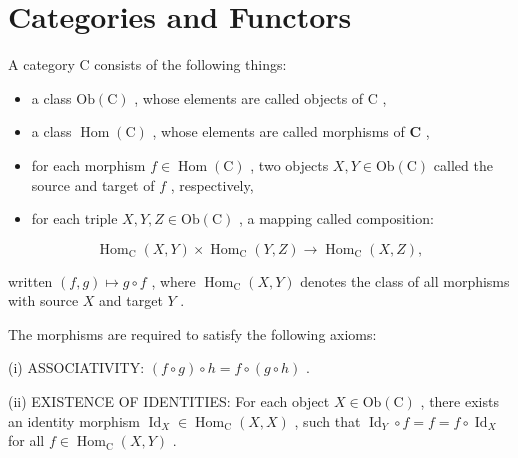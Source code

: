\section{Categories and Functors}

\begin{definition}
\label{def:3-19-extra-1}
\mathlibok
A category C consists of the following things:

\begin{itemize}
\item a class $\mathrm{{Ob}}\left( \mathrm{C}\right)$ , whose elements are called objects of $\mathrm{C}$ ,
\end{itemize}

\begin{itemize}
\item a class $\operatorname{Hom}\left( \mathrm{C}\right)$ , whose elements are called morphisms of $\mathbf{C}$ ,
\end{itemize}

\begin{itemize}
\item for each morphism $f \in  \operatorname{Hom}\left( \mathrm{C}\right)$ , two objects $X, Y \in  \mathrm{{Ob}}\left( \mathrm{C}\right)$ called the source and target of $f$ , respectively,
\end{itemize}

\begin{itemize}
\item for each triple $X, Y, Z \in  \mathrm{{Ob}}\left( \mathrm{C}\right)$ , a mapping called composition:
\end{itemize}

\[
{\operatorname{Hom}}_{\mathrm{C}}\left( {X, Y}\right)  \times  {\operatorname{Hom}}_{\mathrm{C}}\left( {Y, Z}\right)  \rightarrow  {\operatorname{Hom}}_{\mathrm{C}}\left( {X, Z}\right) ,
\]

written $\left( {f, g}\right)  \mapsto  g \circ  f$ , where ${\operatorname{Hom}}_{\mathrm{C}}\left( {X, Y}\right)$ denotes the class of all morphisms with source $X$ and target $Y$ .

The morphisms are required to satisfy the following axioms:

(i) ASSOCIATIVITY: $\left( {f \circ  g}\right)  \circ  h = f \circ  \left( {g \circ  h}\right)$ .

(ii) EXISTENCE OF IDENTITIES: For each object $X \in  \mathrm{{Ob}}\left( \mathrm{C}\right)$ , there exists an identity morphism ${\operatorname{Id}}_{X} \in  {\operatorname{Hom}}_{\mathrm{C}}\left( {X, X}\right)$ , such that ${\operatorname{Id}}_{Y} \circ  f = f = f \circ  {\operatorname{Id}}_{X}$ for all $f \in  {\operatorname{Hom}}_{\mathrm{C}}\left( {X, Y}\right)$ .
\end{definition}

